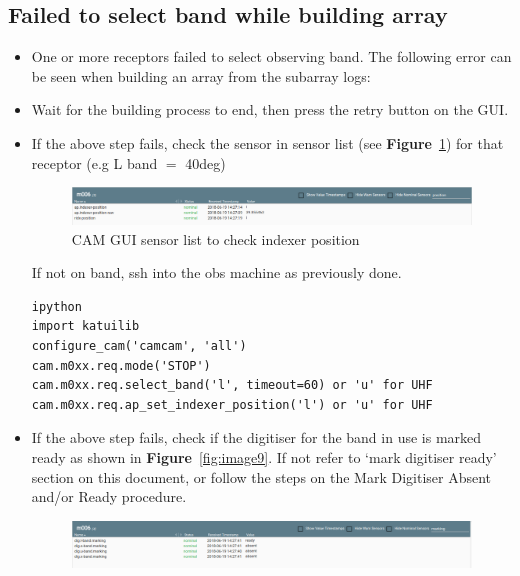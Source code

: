 \subsection{ Failed to select band while building array}
\begin{itemize}
\item{} One or more receptors failed to select observing band. The following error can be seen when building an array from the subarray logs:\\  
\item{} Wait for the building process to end, then press the retry button on the GUI.
\item{} If the above step fails, check the  sensor in sensor list (see \textbf{Figure}~\ref{fig:image72}) for that receptor (e.g L band $=$ 40\unit{deg})

\begin{figure}[!thb]
	\centering
	\includegraphics[scale=0.37]{Chapters/images/image72.png}
	
	\caption{CAM GUI sensor list to check indexer position}
	\label{fig:image72}
\end{figure}

If not on band, ssh into the obs machine as previously done.
\begin{lstlisting}[style=DOS]
ipython
import katuilib
configure_cam('camcam', 'all')
cam.m0xx.req.mode('STOP')
cam.m0xx.req.select_band('l', timeout=60) or 'u' for UHF  
cam.m0xx.req.ap_set_indexer_position('l') or 'u' for UHF
\end{lstlisting}


\item{} If the above step fails, check if the digitiser for the band in use is marked ready as shown in \textbf{Figure}~\ref{fig:image9}. If not refer to ‘mark digitiser ready’ section on this document, or follow the steps on the  Mark Digitiser Absent and/or Ready procedure.

\begin{figure}[!thb]
	\centering
	\includegraphics[scale=0.37]{Chapters/images/image9.png}
	

\end{figure}
\end{itemize}

